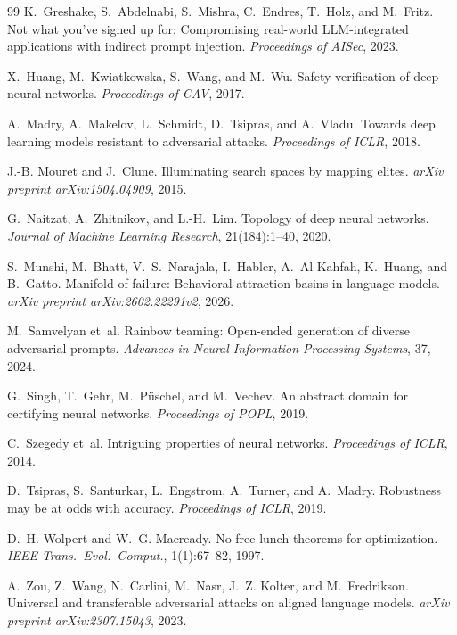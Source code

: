 \documentclass{article}
\begin{document}
\begin{thebibliography}{99}
K.~Greshake, S.~Abdelnabi, S.~Mishra, C.~Endres, T.~Holz, and M.~Fritz.
\newblock Not what you've signed up for: Compromising real-world
  {LLM}-integrated applications with indirect prompt injection.
\newblock \emph{Proceedings of AISec}, 2023.

X.~Huang, M.~Kwiatkowska, S.~Wang, and M.~Wu.
\newblock Safety verification of deep neural networks.
\newblock \emph{Proceedings of CAV}, 2017.

A.~Madry, A.~Makelov, L.~Schmidt, D.~Tsipras, and A.~Vladu.
\newblock Towards deep learning models resistant to adversarial attacks.
\newblock \emph{Proceedings of ICLR}, 2018.

J.-B. Mouret and J.~Clune.
\newblock Illuminating search spaces by mapping elites.
\newblock \emph{arXiv preprint arXiv:1504.04909}, 2015.

G.~Naitzat, A.~Zhitnikov, and L.-H.~Lim.
\newblock Topology of deep neural networks.
\newblock \emph{Journal of Machine Learning Research}, 21(184):1--40, 2020.

S.~Munshi, M.~Bhatt, V.~S.~Narajala, I.~Habler, A.~Al-Kahfah,
K.~Huang, and B.~Gatto.
\newblock Manifold of failure: Behavioral attraction basins in language
  models.
\newblock \emph{arXiv preprint arXiv:2602.22291v2}, 2026.

M.~Samvelyan et~al.
\newblock Rainbow teaming: Open-ended generation of diverse adversarial
  prompts.
\newblock \emph{Advances in Neural Information Processing Systems}, 37,
2024.

G.~Singh, T.~Gehr, M.~P{\"u}schel, and M.~Vechev.
\newblock An abstract domain for certifying neural networks.
\newblock \emph{Proceedings of POPL}, 2019.

C.~Szegedy et~al.
\newblock Intriguing properties of neural networks.
\newblock \emph{Proceedings of ICLR}, 2014.

D.~Tsipras, S.~Santurkar, L.~Engstrom, A.~Turner, and A.~Madry.
\newblock Robustness may be at odds with accuracy.
\newblock \emph{Proceedings of ICLR}, 2019.

D.~H. Wolpert and W.~G. Macready.
\newblock No free lunch theorems for optimization.
\newblock \emph{IEEE Trans.\ Evol.\ Comput.}, 1(1):67--82, 1997.

A.~Zou, Z.~Wang, N.~Carlini, M.~Nasr, J.~Z. Kolter, and
M.~Fredrikson.
\newblock Universal and transferable adversarial attacks on aligned
  language models.
\newblock \emph{arXiv preprint arXiv:2307.15043}, 2023.
\end{thebibliography}
\end{document}
